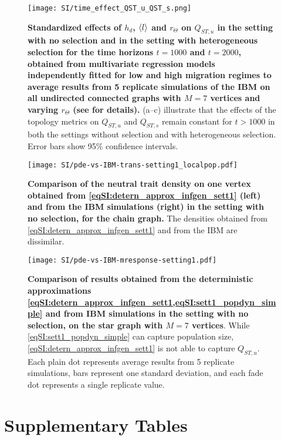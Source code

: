 \begin{figure}[ht]
  \centering
    \texttt{[image: SI/time\_effect\_QST\_u\_QST\_s.png]}
    \caption{\textbf{Standardized effects of $h_d$, $\langle l \rangle$ and $r_\Theta$ on $Q_{ST,u}$ in the setting with no selection and in the setting with heterogeneous selection for the time horizons $t=1000$ and $t=2000$, obtained from multivariate regression models independently fitted for low and high migration regimes to average results from 5 replicate simulations of the IBM on all undirected connected graphs with $M=7$ vertices and varying $r_\Theta$ (see  for details).} (a--c) illustrate that the effects of the topology metrics on $Q_{ST,u}$ and  $Q_{ST,s}$ remain constant for $t > 1000$ in both the settings without selection and with heterogeneous selection. Error bars show 95\% confidence intervals. }\label{time_effect_Q_ST_u}
\end{figure}

\begin{figure}[ht]
  \centering
      \texttt{[image: SI/pde-vs-IBM-trans-setting1\_localpop.pdf]}
    \caption{ \textbf{Comparison of the neutral trait density on one vertex obtained from \cref{eqSI:detern_approx_infgen_sett1} (left) and from the IBM simulations (right) in the setting with no selection, for the chain graph.} The densities obtained from \cref{eqSI:detern_approx_infgen_sett1} and from the IBM are dissimilar.}
    \label{figSI:pde-vs-IBM-trans-setting1_localpop}
  \end{figure}

\begin{figure}[ht]
  \centering
    \texttt{[image: SI/pde-vs-IBM-mresponse-setting1.pdf]} 
    \caption{\textbf{Comparison of results obtained from the deterministic approximations \cref{eqSI:detern_approx_infgen_sett1,eqSI:sett1_popdyn_simple} and from IBM simulations in the setting with no selection, on the star graph with $M=7$ vertices}. While \cref{eqSI:sett1_popdyn_simple} can capture population size, \cref{eqSI:detern_approx_infgen_sett1} is not able to capture $Q_{ST,u}$. Each plain dot represents average results from 5 replicate simulations, bars represent one standard deviation, and each fade dot represents a single replicate value.
    }
    \label{figSI:pde-vs-IBM-mresponse-setting1}
\end{figure}
\clearpage

\section{Supplementary Tables}

